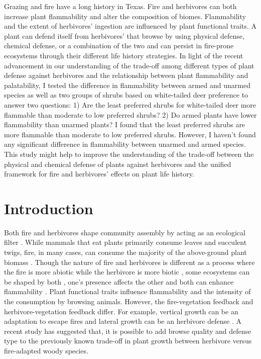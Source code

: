 \documentclass{ttuthes2007}
\begin{document}
Grazing and fire have a long history in Texas. Fire and herbivores can both increase plant flammability and alter the composition of biomes. Flammability and the extent of herbivores' ingestion are influenced by plant functional traits. A plant can defend itself from herbivores' that browse by using physical defense, chemical defense, or a combination of the two and can persist in fire-prone ecosystems through their different life history strategies. In light of the recent advancement in our understanding of the trade-off among different types of plant defense against herbivores and the relationship between plant flammability and palatability, I tested the difference in flammability between armed and unarmed species as well as two groups of shrubs based on white-tailed deer preference to answer two questions: 1) Are the least preferred shrubs for white-tailed deer more flammable than moderate to low preferred shrubs? 2) Do armed plants have lower flammability than unarmed plants? I found that the least preferred shrubs are more flammable than moderate to low preferred shrubs. However, I haven't found any significant difference in flammability between
unarmed and armed species. This study might help to improve the understanding of the trade-off between the physical and chemical defense of plants against herbivores and the unified framework for fire and herbivores' effects on plant life history. 


\section{Introduction}

Both fire and herbivores shape community assembly by acting as an ecological filter \citep{belsky1992effects, grazingecologicalfilters, morphospace, verdu2007ecologicalfilter,fireecologicalfitlers}. While mammals that eat plants primarily consume leaves and succulent twigs, fire, in many cases, can consume the majority of the above-ground plant biomass \citep{bond1996fire, bond2005fire}. Though the nature of fire and herbivores is different as a process where the fire is more abiotic while the herbivore is more biotic  \citep{bond2005fire,archibald2019unified}, some ecosystems can be shaped by both \citep{van2003effects,  archibald2005shaping,staver2009browsing,donaldson2018ecological, noy1995interactive}, one's presence affects the other\citep{holdo2009grazers, foster2015synergistic} and both can enhance flammability \citep{white1994monoterpenes, owens1998seasonal, pausas2012firesulex}. Plant functional traits influence flammability and the intensity of the consumption by browsing animals. However, the fire-vegetation feedback and herbivore-vegetation feedback differ. For example,  vertical growth can be an adaptation to escape fires and lateral growth can be an herbivore defense \citep{archibald2003growing,staver2012top,moncrieff2011tree}.  %
A recent study \citep{wigley2015mammal} has suggested that, it is possible to add browse quality and defense type to the previously known trade-off in plant growth between herbivore versus fire-adapted woody species.
\end{document}
